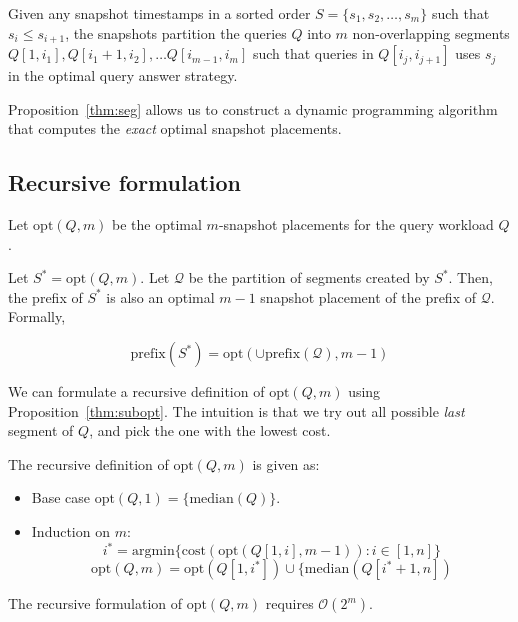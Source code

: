 \begin{prop}
    \label{thm:seg}
    Given any snapshot timestamps in a sorted order $S = \{s_1, s_2, \dots,
    s_m\}$ such that $s_i\leq s_{i+1}$, the snapshots partition the queries $Q$
    into $m$ non-overlapping segments $Q[1, i_1], Q[i_1+1, i_2], \dots
    Q[i_{m-1}, i_m]$ such that queries in $Q[i_j, i_{j+1}]$ uses $s_j$
    in the optimal query answer strategy.
\end{prop}

Proposition~\ref{thm:seg} allows us to construct a dynamic programming algorithm
that computes the {\em exact} optimal snapshot placements.

\subsection{Recursive formulation}
\label{sec:recursive}

Let $\mathrm{opt}(Q, m)$ be the optimal $m$-snapshot placements for the query
workload $Q$.

\begin{prop}
    \label{thm:subopt}
    Let $S^* = \mathrm{opt}(Q, m)$.  Let $\mathcal{Q}$ be the partition
    of segments created by $S^*$.  Then, the prefix of $S^*$ is also an optimal
    $m-1$ snapshot placement of the prefix of $\mathcal{Q}$.  Formally,

    $$\mathrm{prefix}(S^*) = \mathrm{opt}(\cup\mathrm{prefix}(\mathcal{Q}), m-1)$$
\end{prop}

We can formulate a recursive definition of $\mathrm{opt}(Q, m)$ using
Proposition~\ref{thm:subopt}.  The intuition is that we try out all possible
{\em last} segment of $Q$, and pick the one with the lowest cost.

The recursive definition of $\mathrm{opt}(Q, m)$ is given as:

\begin{itemize}
    \item Base case $ \mathrm{opt}(Q, 1) = \{\mathrm{median}(Q)\}$.
    \item Induction on $m$:
    $$i^* = \mathrm{argmin}\{\mathrm{cost}(\mathrm{opt}(Q[1,i], m-1)): i\in[1,
    n]\}$$
    $$
    \mathrm{opt}(Q, m) = \mathrm{opt}(Q[1, i^*]) \cup \{\mathrm{median}(Q[i^*+1, n])
    $$
\end{itemize}

\begin{prop}
    The recursive formulation of $\mathrm{opt}(Q, m)$ requires
    $\mathcal{O}(2^{m})$.
\end{prop}

